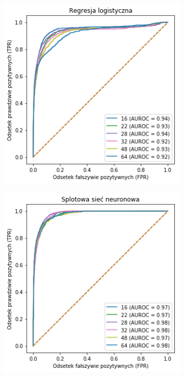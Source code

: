 \begin{figure}[h!]
  \centering
  \begin{subfigure}[b]{0.45\linewidth}
    \includegraphics[width=\linewidth]{images/logreg_patch_roc}
  \end{subfigure}
  \begin{subfigure}[b]{0.45\linewidth}
    \includegraphics[width=\linewidth]{images/cnn_patch_roc}
  \end{subfigure}
  \caption{}
  \label{fig:supervised_patches}
\end{figure}

